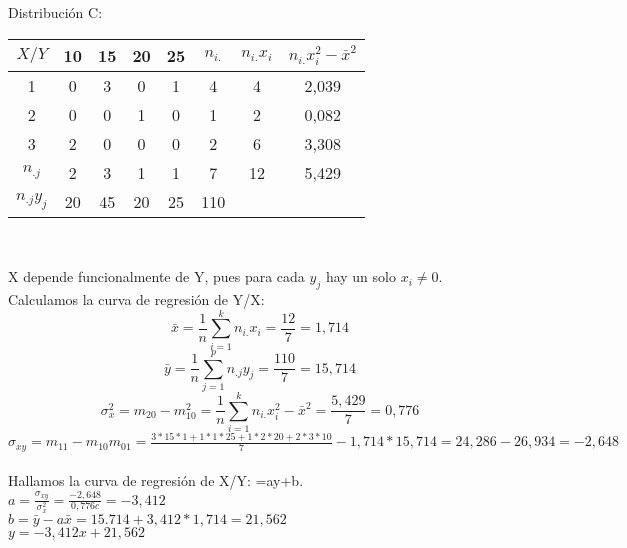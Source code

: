 \documentclass{article}
\begin{document}
    Distribución C:
    \begin{center}
    \begin{tabular}{| c | c | c | c | c | c | c | c |}
        \hline
        $X / Y$ & 10 & 15 & 20 & 25 & $n_{i.}$ & $n_{i.}x_i$ & $n_{i.}x_i^2-\bar{x}^2$\\ \hline
        1 & 0 & 3 & 0 & 1 & 4 & 4 & 2,039 \\
        2 & 0 & 0 & 1 & 0 & 1 & 2 & 0,082 \\
        3 & 2 & 0 & 0 & 0 & 2 & 6 & 3,308 \\
        $n_{.j}$ & 2 & 3 & 1 & 1 & 7 & 12 & 5,429 \\
        $n_{.j}y_j$ & 20 & 45 & 20 & 25 & 110 & & \\
        \hline
    \end{tabular} \\ 
    \end{center}
    X depende funcionalmente de Y, pues para cada $y_j$ hay un solo $x_i\neq 0$. 
    Calculamos la curva de regresión de Y/X: 
    \[\bar{x} = \frac{1}{n}\sum_{i=1}^{k}n_{i.}x_i = \frac{12}{7} = 1,714 \]
    \[\bar{y} = \frac{1}{n}\sum_{j=1}^{p}n_{.j}y_j = \frac{110}{7} = 15,714 \]
    \[\sigma_x^2 = m_{20}-m_{10}^2 = \frac{1}{n}\sum_{i=1}^{k}n_{i.}x_i^2-\bar{x}^2 = \frac{5,429}{7} = 0,776\]
    $\sigma_{xy} = m_{11}-m_{10}m_{01} = \frac{3*15*1+1*1*25+1*2*20+2*3*10}{7} - 1,714*15,714 = 24,286 - 26,934 = -2,648 $ \\ \\
    Hallamos la curva de regresión de X/Y: =ay+b. \\
    $a = \frac{\sigma_{xy}}{\sigma_x^2} = \frac{-2,648}{0,776c} = -3,412$ \\
    $b = \bar{y}-a\bar{x} = 15.714 +3,412*1,714 = 21,562$ \\
    $y=-3,412x + 21,562$ \\ \\ 
    
\end{document}
